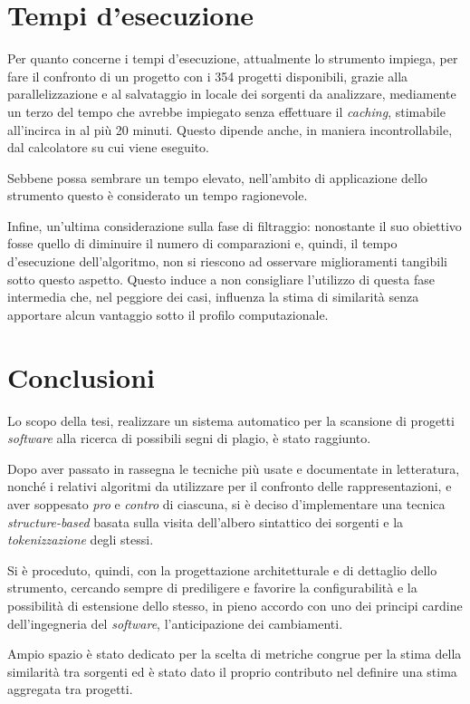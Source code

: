 \section{Tempi d'esecuzione}
Per quanto concerne i tempi d'esecuzione, attualmente lo strumento impiega, per fare il confronto di un progetto con i 354 progetti disponibili, grazie alla parallelizzazione e al salvataggio in locale dei sorgenti da analizzare, mediamente un terzo del tempo che avrebbe impiegato senza effettuare il \textit{caching}, stimabile all'incirca in al più 20 minuti.
%
Questo dipende anche, in maniera incontrollabile, dal calcolatore su cui viene eseguito.

Sebbene possa sembrare un tempo elevato, nell'ambito di applicazione dello strumento questo è considerato un tempo ragionevole.

Infine, un'ultima considerazione sulla fase di filtraggio: nonostante il suo obiettivo fosse quello di diminuire il numero di comparazioni e, quindi, il tempo d'esecuzione dell'algoritmo, non si riescono ad osservare miglioramenti tangibili sotto questo aspetto.
%
Questo induce a non consigliare l'utilizzo di questa fase intermedia che, nel peggiore dei casi, influenza la stima di similarità senza apportare alcun vantaggio sotto il profilo computazionale.

\section{Conclusioni}
Lo scopo della tesi, realizzare un sistema automatico per la scansione di progetti \textit{software} alla ricerca di possibili segni di plagio, è stato raggiunto.

Dopo aver passato in rassegna le tecniche più usate e documentate in letteratura, nonché i relativi algoritmi da utilizzare per il confronto delle rappresentazioni, e aver soppesato \textit{pro} e \textit{contro} di ciascuna, si è deciso d'implementare una tecnica \textit{structure-based} basata sulla visita dell'albero sintattico dei sorgenti e la \textit{tokenizzazione} degli stessi.

Si è proceduto, quindi, con la progettazione architetturale e di dettaglio dello strumento, cercando sempre di prediligere e favorire la configurabilità e la possibilità di estensione dello stesso, in pieno accordo con uno dei principi cardine dell'ingegneria del \textit{software}, l'anticipazione dei cambiamenti.

Ampio spazio è stato dedicato per la scelta di metriche congrue per la stima della similarità tra sorgenti ed è stato dato il proprio contributo nel definire una stima aggregata tra progetti.

